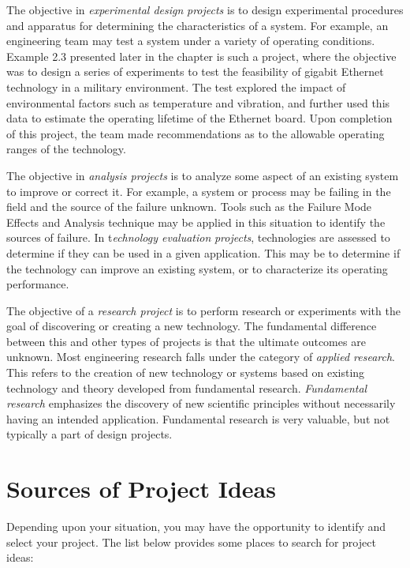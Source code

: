 The objective in \emph{experimental design} \emph{projects} is to design
experimental procedures and apparatus for determining the
characteristics of a system. For example, an engineering team may test a
system under a variety of operating conditions. Example 2.3 presented
later in the chapter is such a project, where the objective was to
design a series of experiments to test the feasibility of gigabit
Ethernet technology in a military environment. The test explored the
impact of environmental factors such as temperature and vibration, and
further used this data to estimate the operating lifetime of the
Ethernet board. Upon completion of this project, the team made
recommendations as to the allowable operating ranges of the technology.

The objective in \emph{analysis projects} is to analyze some aspect of
an existing system to improve or correct it. For example, a system or
process may be failing in the field and the source of the failure
unknown. Tools such as the Failure Mode Effects and Analysis technique
may be applied in this situation to identify the sources of failure. In
t\emph{echnology evaluation} \emph{projects}, technologies are assessed
to determine if they can be used in a given application. This may be to
determine if the technology can improve an existing system, or to
characterize its operating performance.

The objective of a \emph{research project} is to perform research or
experiments with the goal of discovering or creating a new technology.
The fundamental difference between this and other types of projects is
that the ultimate outcomes are unknown. Most engineering research falls
under the category of \emph{applied research}. This refers to the
creation of new technology or systems based on existing technology and
theory developed from fundamental research. \emph{Fundamental research}
emphasizes the discovery of new scientific principles without
necessarily having an intended application. Fundamental research is very
valuable, but not typically a part of design projects.

\section{Sources of Project Ideas}
\label{section:sources-of-project-ideas}

Depending upon your situation, you may have the opportunity to identify
and select your project. The list below provides some places to search
for project ideas:

